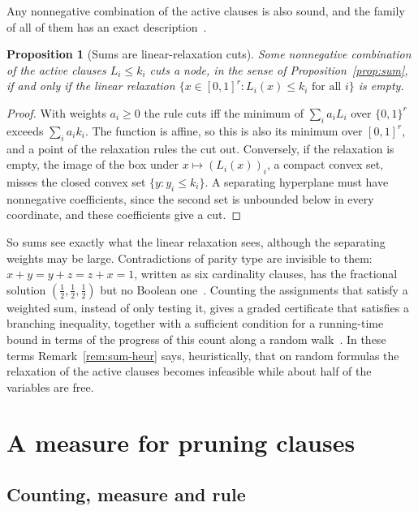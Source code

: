 \documentclass[11pt,a4paper]{article}
\newtheorem{proposition}[theorem]{Proposition}
\theoremstyle{remark}
\begin{document}
Any nonnegative combination of the active clauses is also sound, and the
family of all of them has an exact description~\cite{N5}.

\begin{proposition}[Sums are linear-relaxation cuts]\label{prop:lp}
Some nonnegative combination of the active clauses $L_i\le k_i$ cuts a node,
in the sense of Proposition~\ref{prop:sum}, if and only if the linear
relaxation $\{x\in[0,1]^r:L_i(x)\le k_i\text{ for all }i\}$ is empty.
\end{proposition}

\begin{proof}
With weights $a_i\ge0$ the rule cuts iff the minimum of $\sum_ia_iL_i$ over
$\{0,1\}^r$ exceeds $\sum_ia_ik_i$. The function is affine, so this is also its
minimum over $[0,1]^r$, and a point of the relaxation rules the cut out.
Conversely, if the relaxation is empty, the image of the box under
$x\mapsto(L_i(x))_i$, a compact convex set, misses the closed convex set
$\{y:y_i\le k_i\}$. A separating hyperplane must have nonnegative coefficients,
since the second set is unbounded below in every coordinate, and these
coefficients give a cut.
\end{proof}

So sums see exactly what the linear relaxation sees, although the separating
weights may be large. Contradictions of parity type are invisible to them:
$x+y=y+z=z+x=1$, written as six cardinality clauses, has the fractional solution
$(\frac12,\frac12,\frac12)$ but no Boolean one~\cite{N5}. Counting the
assignments that satisfy a weighted sum, instead of only testing it, gives a
graded certificate that satisfies a branching inequality, together with a
sufficient condition for a running-time bound in terms of the progress of this
count along a random walk~\cite{N5}. In these terms Remark~\ref{rem:sum-heur}
says, heuristically, that on random formulas the relaxation of the active
clauses becomes infeasible while about half of the variables are free.

\section{A measure for pruning clauses}\label{sec:measure}

\subsection{Counting, measure and rule}
\end{document}
